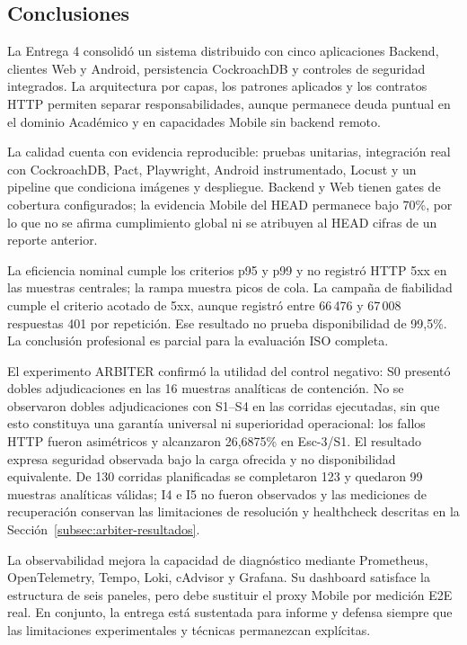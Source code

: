 \subsection{Conclusiones}
\label{subsec:conclusiones-e4}

La Entrega 4 consolidó un sistema distribuido con cinco aplicaciones Backend,
clientes Web y Android, persistencia CockroachDB y controles de seguridad
integrados. La arquitectura por capas, los patrones aplicados y los contratos
HTTP permiten separar responsabilidades, aunque permanece deuda puntual en el
dominio Académico y en capacidades Mobile sin backend remoto.

La calidad cuenta con evidencia reproducible: pruebas unitarias, integración
real con CockroachDB, Pact, Playwright, Android instrumentado, Locust y un
pipeline que condiciona imágenes y despliegue. Backend y Web tienen gates de
cobertura configurados; la evidencia Mobile del HEAD permanece bajo 70\%, por
lo que no se afirma cumplimiento global ni se atribuyen al HEAD cifras de un
reporte anterior.

La eficiencia nominal cumple los criterios p95 y p99 y no registró HTTP 5xx en
las muestras centrales; la rampa muestra picos de cola. La campaña de fiabilidad cumple el criterio acotado de
5xx, aunque registró entre 66\,476 y 67\,008 respuestas 401 por repetición. Ese
resultado no prueba disponibilidad de 99,5\%. La conclusión profesional es
parcial para la evaluación ISO completa.

El experimento ARBITER confirmó la utilidad del control negativo: S0 presentó
dobles adjudicaciones en las 16 muestras analíticas de contención. No se
observaron dobles adjudicaciones con S1--S4 en las corridas ejecutadas, sin que
esto constituya una garantía universal ni superioridad operacional: los fallos
HTTP fueron asimétricos y alcanzaron 26,6875\% en Esc-3/S1. El resultado expresa
seguridad observada bajo la carga ofrecida y no disponibilidad equivalente. De
130 corridas planificadas se
completaron 123 y quedaron 99 muestras analíticas válidas; I4 e I5 no fueron
observados y las mediciones de recuperación conservan las limitaciones de
resolución y healthcheck descritas en la Sección~\ref{subsec:arbiter-resultados}.

La observabilidad mejora la capacidad de diagnóstico mediante Prometheus,
OpenTelemetry, Tempo, Loki, cAdvisor y Grafana. Su dashboard satisface la
estructura de seis paneles, pero debe sustituir el proxy Mobile por medición E2E
real. En conjunto, la entrega está sustentada para informe y defensa siempre que
las limitaciones experimentales y técnicas permanezcan explícitas.

